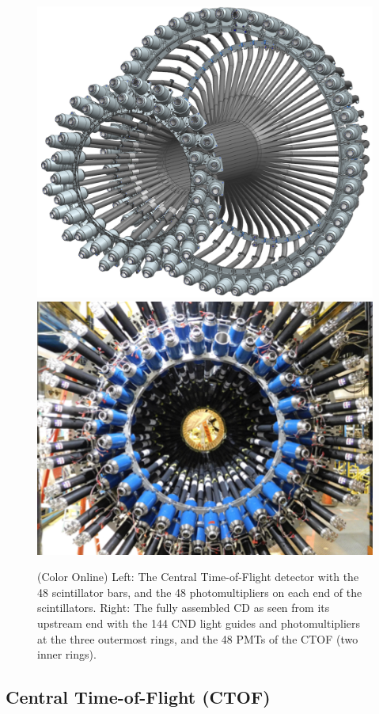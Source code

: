 \documentclass[final,3p,twocolumn]{elsarticle}
\begin{document}
\begin{figure}[htbp!]
\hspace{-0.3cm}\centerline{\includegraphics[width=1.1\columnwidth]{ctof-design.png}
\hspace{0.3cm}\includegraphics[angle=90,width=0.8\columnwidth]{cnd-ctof.png}}
\caption{(Color Online) Left: The Central Time-of-Flight detector with the 48 scintillator bars, and the 48 photomultipliers on each end
of the scintillators. Right: The fully assembled CD as seen from its upstream end with the 144 CND light guides and
photomultipliers at the three outermost rings, and the 48 PMTs of the CTOF (two inner rings). } 
\label{ctof-cnd}
\end{figure} 

\subsection{Central Time-of-Flight (CTOF)}
\end{document}
